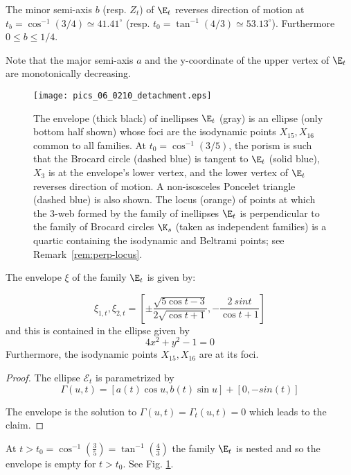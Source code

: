 \begin{corollary}
 The minor semi-axis $b$ (resp. $Z_t$) of $\E_t$ reverses direction of motion at $t_b=\cos^{-1}(3/4){\simeq}41.41^\circ$ (resp. $t_0=\tan^{-1}(4/3){\simeq}53.13^\circ$). Furthermore $0{\leq}b{\leq}1/4$.
\end{corollary}

Note that the major semi-axis $a$ and the y-coordinate of the upper vertex of $\E_t$ are monotonically decreasing.

\begin{figure}
    \centering
    \texttt{[image: pics\_06\_0210\_detachment.eps]}
    \caption{The envelope (thick black) of inellipses $\E_t$ (gray) is an ellipse (only bottom half shown) whose foci are the isodynamic points $X_{15},X_{16}$ common to all families. At $t_0=\cos^{-1}(3/5)$, the porism is such that the Brocard circle (dashed blue) is tangent to $\E_t$ (solid blue), $X_3$ is at the envelope's lower vertex, and the lower vertex of $\E_t$ reverses direction of motion. A non-isosceles Poncelet triangle (dashed blue) is also shown. The locus (orange) of points at which the 3-web formed by the family of inellipses $\E_t$ is perpendicular to the family of Brocard circles $\K_s$ (taken as independent families) is a quartic containing the isodynamic  and Beltrami points; see Remark~\ref{rem:perp-locus}.}
    \label{fig:detach}
\end{figure}

\begin{proposition}
 The envelope $\xi$ of the family $\E_t$ is given by:
 
 \[ \xi_{1,t},\xi_{2,t}= \left[\pm \frac{ \sqrt{5\cos t-3}}{2\sqrt{\cos t+1}},
 -\frac{2\ sin t}{ \cos t+1}
 \right]
 \]
 and this is contained in the ellipse given by
 \[4x^2+y^2-1=0\]
 Furthermore, the isodynamic points $X_{15},X_{16}$ are at its foci.
\end{proposition}

\begin{proof}
 The ellipse $\mathcal{E}_t$ is parametrized by
 \[ \Gamma(u,t)=[a(t)\cos u, b(t)\sin u]+[0,-sin(t)]\]

The envelope is the solution to $\Gamma(u,t)=\Gamma_t(u,t)=0$ which leads to the claim.
\end{proof}

\begin{remark} At $t>t_0=\cos^{-1}(\frac{3}{5})=\tan^{-1}(\frac{4}{3})$ the family $\E_t$ is nested and so the envelope is empty for $t>t_0.$  See Fig. \ref{fig:detach}.
\end{remark}
  
